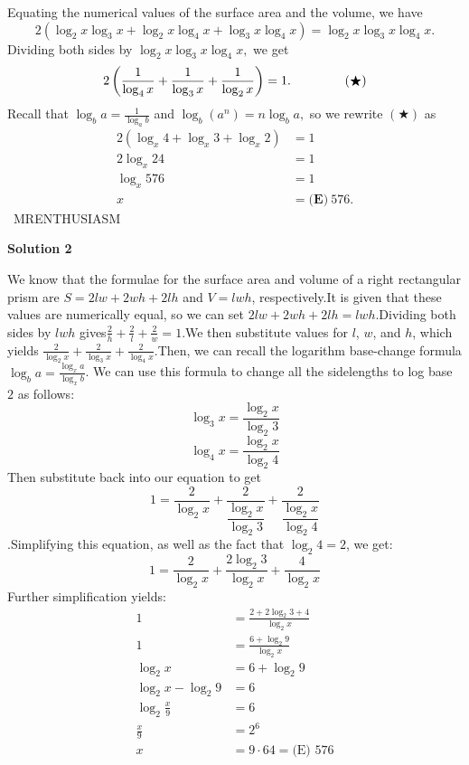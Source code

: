 \begin{enumerate}
 Equating the numerical values of the surface area and the volume, we have 
 \[2(\log_{2}x\log_{3}x+\log_{2}x\log_{4}x+\log_{3}x\log_{4}x)=\log_{2}x\log_{3}x\log_{4}x.\]Dividing both sides by $\log_{2}x\log_{3}x\log_{4}x,$ we get 
 \[2\left(\frac{1}{\log_{4}x}+\frac{1}{\log_{3}x}+\frac{1}{\log_{2}x}\right)=1. \hspace{15mm} (\bigstar)\]Recall that $\log_{b}a=\frac{1}{\log_{a}b}$ and $\log_{b}\left(a^n\right)=n\log_{b}a,$ so we rewrite $(\bigstar)$ as 
 \begin{align*} 2(\log_{x}4+\log_{x}3+\log_{x}2)&=1 \\ 2\log_{x}24&=1 \\ \log_{x}576&=1 \\ x&=\boxed{\textbf{(E)}\ 576}. \end{align*}
~MRENTHUSIASM

 



\textbf{Solution 2}

We know that the formulae for the surface area and volume of a right rectangular prism are $S=2lw+2wh+2lh$ and $V=lwh$, respectively.It is given that these values are numerically equal, so we can set $2lw+2wh+2lh=lwh$.Dividing both sides by $lwh$ gives$\frac{2}{h} + \frac{2}{l} + \frac{2}{w} = 1$.We then substitute values for $l$, $w$, and $h$, which yields $\frac{2}{\log_2 x} + \frac{2}{\log_3 x} + \frac{2}{\log_4 x}$.Then, we can recall the logarithm base-change formula $\log_b a = \frac{\log_x a}{\log_x b}$. We can use this formula to change all the sidelengths to log base $2$ as follows:
 \[\log_3 x = \frac{\log_2 x}{\log_2 3}\]
 \[\log_4 x = \frac{\log_2 x}{\log_2 4}\]Then substitute back into our equation to get
 \[1 = \frac{2}{\log_2 x} + \frac{2}{\dfrac{\log_2 x}{\log_2 3}} + \frac{2}{\dfrac{\log_2 x}{\log_2 4}}\].Simplifying this equation, as well as the fact that $\log_2 4 = 2$, we get:
 \[1 = \frac{2}{\log_2 x} + \frac{2\log_2 3}{\log_2 x} + \frac{4}{\log_2 x}\]Further simplification yields:\begin{align*}1 &= \frac{2+2\log_2 3+4}{\log_2 x} \\1 &= \frac{6+\log_2 9}{\log_2 x} \\\log_2 x &= 6+\log_2 9 \\\log_2 x - \log_2 9 &= 6 \\\log_2 \frac{x}{9} &= 6 \\\frac{x}{9} &= 2^6 \\x &= 9 \cdot 64 = \boxed{\text{(E) } 576}\end{align*}



\end{enumerate}
